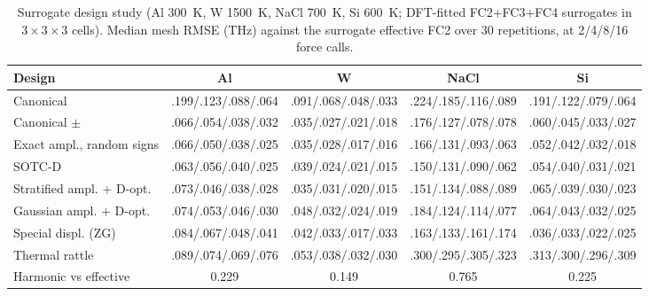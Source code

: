 \begin{table}[t]
\caption{Surrogate design study (Al 300~K, W 1500~K, NaCl 700~K, Si 600~K; DFT-fitted FC2+FC3+FC4 surrogates in $3\times3\times3$ cells). Median mesh RMSE (THz) against the surrogate effective FC2 over 30 repetitions, at 2/4/8/16 force calls.}
\label{tab:surrogate}
\begin{ruledtabular}
\footnotesize
\setlength{\tabcolsep}{3pt}
\begin{tabular}{lcccc}
Design & Al & W & NaCl & Si\\
\hline
Canonical & .199/.123/.088/.064 & .091/.068/.048/.033 & .224/.185/.116/.089 & .191/.122/.079/.064\\
Canonical $\pm$ & .066/.054/.038/.032 & .035/.027/.021/.018 & .176/.127/.078/.078 & .060/.045/.033/.027\\
Exact ampl., random signs & .066/.050/.038/.025 & .035/.028/.017/.016 & .166/.131/.093/.063 & .052/.042/.032/.018\\
SOTC-D & .063/.056/.040/.025 & .039/.024/.021/.015 & .150/.131/.090/.062 & .054/.040/.031/.021\\
Stratified ampl. + D-opt. & .073/.046/.038/.028 & .035/.031/.020/.015 & .151/.134/.088/.089 & .065/.039/.030/.023\\
Gaussian ampl. + D-opt. & .074/.053/.046/.030 & .048/.032/.024/.019 & .184/.124/.114/.077 & .064/.043/.032/.025\\
Special displ. (ZG) & .084/.067/.048/.041 & .042/.033/.017/.033 & .163/.133/.161/.174 & .036/.033/.022/.025\\
Thermal rattle & .089/.074/.069/.076 & .053/.038/.032/.030 & .300/.295/.305/.323 & .313/.300/.296/.309\\
\hline
Harmonic vs effective & 0.229 & 0.149 & 0.765 & 0.225\\
\end{tabular}
\end{ruledtabular}
\end{table}
